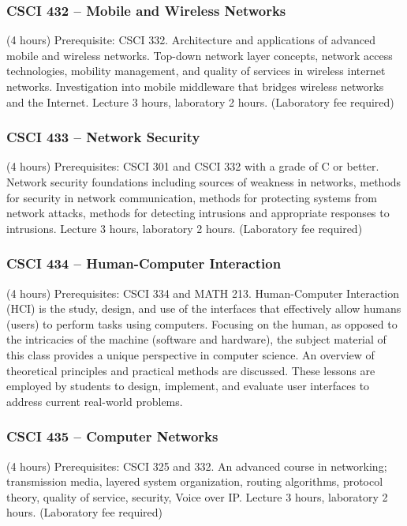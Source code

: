 \subsubsection{CSCI 432 -- Mobile and Wireless Networks}
(4 hours) Prerequisite: CSCI 332. Architecture and applications of advanced mobile and wireless networks. Top-down network layer concepts, network access technologies, mobility management, and quality of services in wireless internet networks. Investigation into mobile middleware that bridges wireless networks and the Internet. Lecture 3 hours, laboratory 2 hours. (Laboratory fee required)

\subsubsection{CSCI 433 -- Network Security}
(4 hours) Prerequisites: CSCI 301 and CSCI 332 with a grade of C or better. Network security foundations including sources of weakness in networks, methods for security in network communication, methods for protecting systems from network attacks, methods for detecting intrusions and appropriate responses to intrusions. Lecture 3 hours, laboratory 2 hours. (Laboratory fee required)

\subsubsection{CSCI 434 -- Human-Computer Interaction}
(4 hours) Prerequisites: CSCI 334 and MATH 213. Human-Computer Interaction (HCI) is the study, design, and use of the interfaces that effectively allow humans (users) to perform tasks using computers. Focusing on the human, as opposed to the intricacies of the machine (software and hardware), the subject material of this class provides a unique perspective in computer science. An overview of theoretical principles and practical methods are discussed. These lessons are employed by students to design, implement, and evaluate user interfaces to address current real-world problems.

\subsubsection{CSCI 435 -- Computer Networks}
(4 hours) Prerequisites: CSCI 325 and 332. An advanced course in networking; transmission media, layered system organization, routing algorithms, protocol theory, quality of service, security, Voice over IP. Lecture 3 hours, laboratory 2 hours. (Laboratory fee required)

